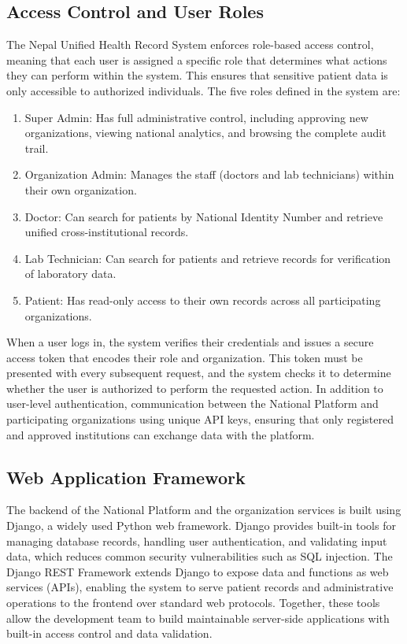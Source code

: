 \documentclass[12pt]{report}
\numberwithin{equation}{chapter}
\begin{document}
\subsection{Access Control and User Roles}
The Nepal Unified Health Record System enforces role-based access control, meaning that each user is assigned a specific role that determines what actions they can perform within the system. This ensures that sensitive patient data is only accessible to authorized individuals. The five roles defined in the system are:
\begin{enumerate}
    \item {Super Admin:} Has full administrative control, including approving new organizations, viewing national analytics, and browsing the complete audit trail.
    \item {Organization Admin:} Manages the staff (doctors and lab technicians) within their own organization.
    \item {Doctor:} Can search for patients by National Identity Number and retrieve unified cross-institutional records.
    \item {Lab Technician:} Can search for patients and retrieve records for verification of laboratory data.
    \item {Patient:} Has read-only access to their own records across all participating organizations.
\end{enumerate}

When a user logs in, the system verifies their credentials and issues a secure access token that encodes their role and organization. This token must be presented with every subsequent request, and the system checks it to determine whether the user is authorized to perform the requested action. In addition to user-level authentication, communication between the National Platform and participating organizations  using unique API keys, ensuring that only registered and approved institutions can exchange data with the platform.

\subsection{Web Application Framework}
The backend of the National Platform and the organization services is built using Django, a widely used Python web framework. Django provides built-in tools for managing database records, handling user authentication, and validating input data, which reduces common security vulnerabilities such as SQL injection. The Django REST Framework extends Django to expose data and functions as web services (APIs), enabling the system to serve patient records and administrative operations to the frontend over standard web protocols. Together, these tools allow the development team to build maintainable server-side applications with built-in access control and data validation.
\end{document}
